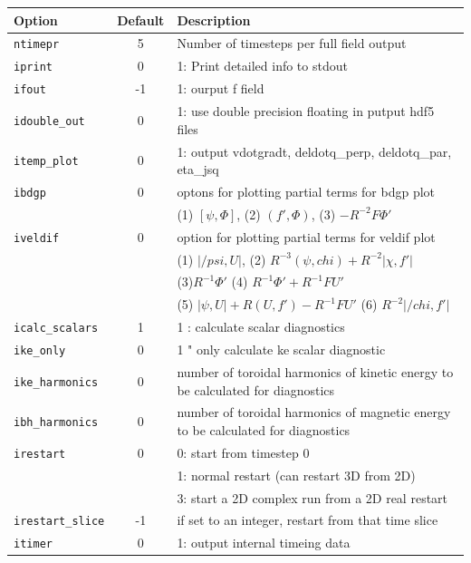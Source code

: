\begin{tabular}{lcp{4in}}
  \textbf{Option}&\textbf{Default}&\textbf{Description}\\
  \hline
  \texttt{ntimepr}   & 5 & Number of timesteps per full field output\\
  \texttt{iprint}    & 0 & 1: Print detailed info to stdout\\
 \texttt{ifout}      & -1 & 1: ourput f field \\
 \texttt{idouble\_out} & 0 & 1: use double precision floating in putput hdf5 files \\
 \texttt{itemp\_plot}  & 0 & 1: output vdotgradt, deldotq\_perp, deldotq\_par, eta\_jsq \\
 \texttt{ibdgp}        & 0 & optons for plotting partial terms for bdgp plot \\
                       &   & (1) $[ \psi, \Phi] $, (2) $(f\prime,\Phi) $, (3) $-R^{-2} F \Phi \prime$ \\
 \texttt{iveldif}      & 0 & option for plotting partial terms for veldif plot \\
                       &   & (1) $|/psi,U|$, (2) $R^{-3}(\psi,chi) + R^{-2}|\chi,f\prime|$ \\
                       &   & (3)$ R^{-1} \Phi \prime$   (4) $R^{-1} \Phi \prime + R^{-1} F U\prime $ \\
                       &   & (5) $|\psi,U| + R(U,f\prime) - R^{-1}F U\prime $ (6) $R^{-2} |/chi,f\prime| $ \\
 \texttt{icalc\_scalars} & 1 & 1 : calculate scalar diagnostics \\
 \texttt{ike\_only}      & 0 & 1 " only calculate ke scalar diagnostic \\
 \texttt{ike\_harmonics} & 0 & number of toroidal harmonics of kinetic energy to be calculated for diagnostics \\
 \texttt{ibh\_harmonics} & 0 & number of toroidal harmonics of magnetic energy to be calculated for diagnostics \\
 \texttt{irestart}       & 0 & 0: start from timestep 0 \\
                         &   & 1: normal restart (can restart 3D from 2D) \\
                         &   & 3: start a 2D complex run from a 2D real restart \\
 \texttt{irestart\_slice}  & -1 & if set to an integer, restart from that time slice \\
 \texttt{itimer}           & 0 & 1: output internal timeing data \\

\end{tabular}
